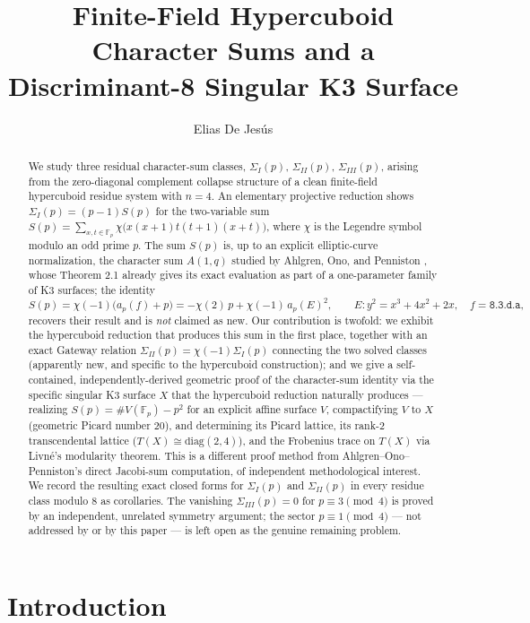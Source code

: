 \documentclass[11pt]{amsart}
\title{Finite-Field Hypercuboid Character Sums and a Discriminant-8 Singular K3 Surface}
\author{Elias De Jes\'us}
\theoremstyle{definition}
\newcommand{\Fp}{\mathbb{F}_p}
\begin{document}
\pagestyle{plain}

\begin{abstract}
We study three residual character-sum classes, $\Sigma_I(p)$, $\Sigma_{II}(p)$, $\Sigma_{III}(p)$, arising from the zero-diagonal complement collapse structure of a clean finite-field hypercuboid residue system with $n=4$. An elementary projective reduction shows $\Sigma_I(p)=(p-1)S(p)$ for the two-variable sum $S(p)=\sum_{x,t\in\Fp}\chi\bigl(x(x+1)t(t+1)(x+t)\bigr)$, where $\chi$ is the Legendre symbol modulo an odd prime $p$. The sum $S(p)$ is, up to an explicit elliptic-curve normalization, the character sum $A(1,q)$ studied by Ahlgren, Ono, and Penniston \cite{AOP2002}, whose Theorem 2.1 already gives its exact evaluation as part of a one-parameter family of K3 surfaces; the identity
\[
S(p)=\chi(-1)\bigl(a_p(f)+p\bigr)=-\chi(2)\,p+\chi(-1)\,a_p(E)^2,\qquad E:y^2=x^3+4x^2+2x,\quad f=\texttt{8.3.d.a},
\]
recovers their result and is \emph{not} claimed as new. Our contribution is twofold: we exhibit the hypercuboid reduction that produces this sum in the first place, together with an exact Gateway relation $\Sigma_{II}(p)=\chi(-1)\Sigma_I(p)$ connecting the two solved classes (apparently new, and specific to the hypercuboid construction); and we give a self-contained, independently-derived geometric proof of the character-sum identity via the specific singular K3 surface $X$ that the hypercuboid reduction naturally produces — realizing $S(p)=\#V(\Fp)-p^2$ for an explicit affine surface $V$, compactifying $V$ to $X$ (geometric Picard number $20$), and determining its Picard lattice, its rank-$2$ transcendental lattice ($T(X)\cong\mathrm{diag}(2,4)$), and the Frobenius trace on $T(X)$ via Livn\'e's modularity theorem. This is a different proof method from Ahlgren--Ono--Penniston's direct Jacobi-sum computation, of independent methodological interest. We record the resulting exact closed forms for $\Sigma_I(p)$ and $\Sigma_{II}(p)$ in every residue class modulo $8$ as corollaries. The vanishing $\Sigma_{III}(p)=0$ for $p\equiv3\pmod4$ is proved by an independent, unrelated symmetry argument; the sector $p\equiv1\pmod4$ — not addressed by \cite{AOP2002} or by this paper — is left open as the genuine remaining problem.
\end{abstract}

\maketitle

\section{Introduction}
\label{sec:intro}
\end{document}

